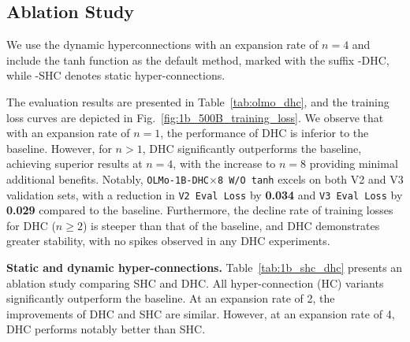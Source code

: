 \documentclass{article} %
\begin{document}
\subsection{Ablation Study}
We use the dynamic hyperconnections with an expansion rate of $n=4$ and include the tanh function as the default method, marked with the suffix -DHC, while -SHC denotes static hyper-connections.


The evaluation results are presented in Table~\ref{tab:olmo_dhc}, and the training loss curves are depicted in Fig.~\ref{fig:1b_500B_training_loss}. We observe that with an expansion rate of $n=1$, the performance of DHC is inferior to the baseline. However, for $n>1$, DHC significantly outperforms the baseline, achieving superior results at $n=4$, with the increase to $n=8$ providing minimal additional benefits. Notably, \texttt{OLMo-1B-DHC$\times$8 W/O tanh} excels on both V2 and V3 validation sets, with a reduction in \texttt{V2 Eval Loss} by \textbf{0.034} and \texttt{V3 Eval Loss} by \textbf{0.029} compared to the baseline. Furthermore, the decline rate of training losses for DHC ($n \geq 2$) is steeper than that of the baseline, and DHC demonstrates greater stability, with no spikes observed in any DHC experiments.




\textbf{Static and dynamic hyper-connections.}
Table~\ref{tab:1b_shc_dhc} presents an ablation study comparing SHC and DHC. All hyper-connection (HC) variants significantly outperform the baseline. At an expansion rate of 2, the improvements of DHC and SHC are similar. However, at an expansion rate of 4, DHC performs notably better than SHC.
\end{document}
